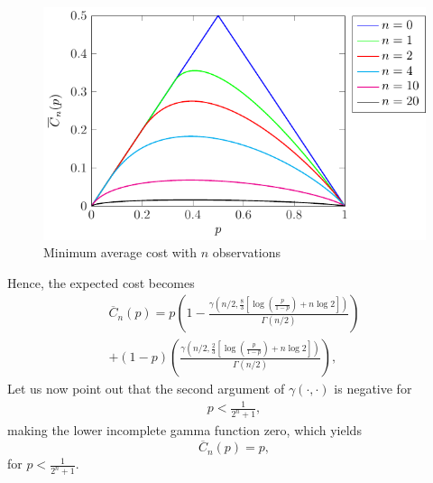 \begin{figure}[t]
	\begin{center}
		\includegraphics{Figures/Expected_Cost1}
	\end{center}
	\caption{Minimum average cost with $n$ observations}
	\label{fig:average_cost_n}
\end{figure}
Hence, the expected cost becomes
\begin{multline}
	\overline{C}_n(p) = p \left(1 - \frac{\gamma \left(n/2,\frac{8}{3} \left[\log \left(\frac{p}{1 - p}  \right) + n \log 2 \right]\right)}{\Gamma(n/2)}\right) \\ + (1 - p) \left(\frac{\gamma \left(n/2,\frac{2}{3} \left[\log \left(\frac{p}{1 - p}  \right) + n \log 2 \right]\right)}{\Gamma(n/2)}\right), \label{eq:cost_n_nogathering}
\end{multline}
Let us now point out that the second argument of $\gamma \left(\cdot, \cdot\right)$ is negative for
\begin{align*}
	p < \frac{1}{2^n + 1},
\end{align*}
making the lower incomplete gamma function zero, which yields
\begin{equation*}
	\overline{C}_n(p) = p,
\end{equation*}
for $p < \frac{1}{2^n + 1}$.

